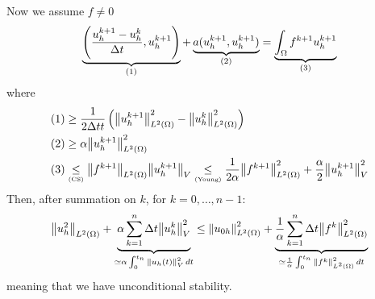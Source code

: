 Now we assume \(f \neq 0\) 
\[
    \underbrace{\left( \frac{u_h^{k+1} - u_h^{k}}{\Delta t}, u_h^{k+1} \right)}_{(1)} + \underbrace{a(u_h^{k+1},u_h^{k+1})}_{(2)} = \underbrace{\int_\Omega f^{k+1}u_h^{k+1}}_{(3)}
\]
where 
\begin{align*}
    (1) &\geq \frac{1}{2\Delta t t} \left( \norm{u_h^{k+1}}_{L^2(\Omega)}^2 -\norm{u_h^{k}}_{L^2(\Omega)}^2 \right) \\
    (2) &\geq \alpha \norm{u_h^{k+1}}_{L^2(\Omega)}^2 \\
    (3) &\underset{\text{\tiny{(CS)}}}{\leq} \norm{f^{k+1}}_{L^2(\Omega)} \norm{u_h^{k+1}}_V \underset{\text{\tiny{(Young)}}}{\leq} \frac{1}{2\alpha} \norm{f^{k+1}}_{L^2(\Omega)}^2 + \frac{\alpha}{2} \norm{u_h^{k+1}}_V^2
\end{align*}
Then, after summation on \(k\), for \(k = 0,\ldots, n-1\):
\begin{equation*}
    \norm{u_h^2}_{L^2(\Omega)} + \underbrace{\alpha \sum_{k=1}^{n}\Delta t \norm{u_h^{k}}_V^2}_{\simeq \alpha \int_0^{t_n} \norm{u_h(t)}_V^2 \, dt} \leq \norm{u_{0h}}_{L^2(\Omega)}^2 + \underbrace{\frac{1}{\alpha} \sum_{k=1}^{n} \Delta t \norm{f^k}_{L^2(\Omega)}^2}_{\simeq\frac{1}{\alpha} \int_0^{t_n} \norm{f^k}_{L^2(\Omega)}^2 \, dt}
\end{equation*}
meaning that we have unconditional stability. 

